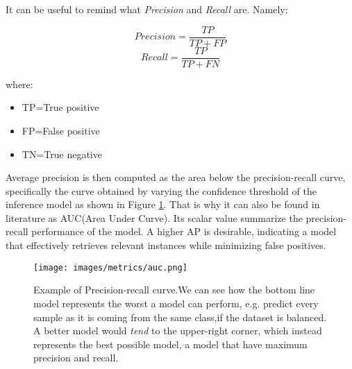 It can be useful to remind what \textit{Precision} and \textit{Recall} are. Namely:

\begin{equation}
    Precision=\frac{TP}{TP+FP}
\end{equation}
\begin{equation}
    Recall=\frac{TP}{TP+FN}
\end{equation}

where:
\begin{itemize}
    \item TP=True positive
    \item FP=False positive
    \item TN=True negative
\end{itemize}
Average precision is then computed as the area below the precision-recall curve, specifically
the curve obtained by varying the confidence threshold of the inference model as shown
in Figure \ref{fig:auc}. That is why 
it can also be found in literature as AUC(Area Under Curve).
Its scalar value summarize the precision-recall performance of the model.
A higher AP is desirable, indicating a model that effectively retrieves 
relevant instances while minimizing false positives.

\begin{figure}[t]
    \centering
    \texttt{[image: images/metrics/auc.png]} %
    \caption{Example of Precision-recall curve.We can see how the bottom line model 
        represents the worst a model can perform, e.g. predict every sample as it is 
        coming from the same class,if the dataset is balanced. A better model would
        \textit{tend} to the upper-right corner, which instead represents the best
        possible model, a model that have maximum precision and recall.}\label{fig:auc}
\end{figure}
